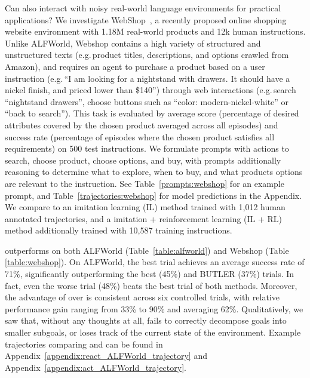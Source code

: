 \label{sec:webshop}
Can \model{} also interact with noisy real-world language environments for practical applications? 
We investigate WebShop~\citep{yao2022webshop}, a recently proposed online shopping website environment with 1.18M real-world products and 12k human instructions. Unlike ALFWorld, Webshop contains a high variety of structured and unstructured texts (e.g.\,product titles, descriptions, and options crawled from Amazon), and requires an agent to purchase a product based on a user instruction (e.g.\,``I am looking for a nightstand
with drawers. It should have a nickel finish, and priced lower than \$140'') through web interactions (e.g.\,search ``nightstand drawers'', choose buttons such as ``color: modern-nickel-white'' or ``back to search''). 
This task is evaluated by average score (percentage of desired attributes covered by the chosen product averaged across all episodes) and success rate (percentage of episodes where the chosen product satisfies all requirements) on 500 test instructions. 
We formulate \act{} prompts with actions to search, choose product, choose options, and buy, with \model{} prompts additionally reasoning to determine what to explore, when to buy, and what products options are relevant to the instruction.
See Table~\ref{prompts:webshop} for an example prompt, and Table~\ref{trajectories:webshop} for model predictions in the Appendix.
We compare to an imitation learning (IL) method trained with 1,012 human annotated trajectories, and a imitation + reinforcement learning (IL + RL) method additionally trained with 10,587 training instructions.














\model{} outperforms \act{} on both ALFWorld (Table~\ref{table:alfworld}) and Webshop (Table \ref{table:webshop}). On ALFWorld, the best \model{} trial achieves an average success rate of 71\%, significantly outperforming the best \act{} (45\%) and BUTLER (37\%) trials. In fact, even the worse \model{} trial (48\%) beats the best trial of both methods. Moreover, the advantage of \model{} over \act{} is consistent across six controlled trials, with relative performance gain ranging from 33\% to 90\% and averaging 62\%. Qualitatively, we saw that, without any thoughts at all, \act{} fails to correctly decompose goals into smaller subgoals, or loses track of the current state of the environment. Example trajectories comparing \model{} and \act{} can be found in Appendix~\ref{appendix:react_ALFWorld_trajectory} and Appendix~\ref{appendix:act_ALFWorld_trajectory}. %

